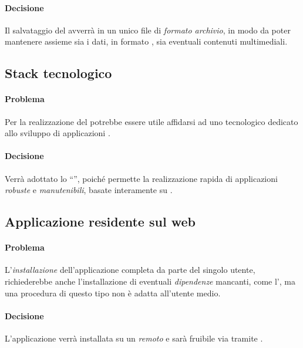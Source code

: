 \paragraph{Decisione} Il salvataggio del  avverrà in un unico file di \emph{formato archivio}, in modo da poter mantenere assieme sia i dati, in formato , sia eventuali contenuti multimediali.
\subsection{Stack tecnologico}
\paragraph{Problema} Per la realizzazione del  potrebbe essere utile affidarsi ad uno  tecnologico dedicato allo sviluppo di applicazioni .
\paragraph{Decisione} Verrà adottato lo  ``'', poiché permette la realizzazione rapida di applicazioni  \emph{robuste} e \emph{manutenibili}, basate interamente su .
\subsection{Applicazione residente sul web}
\paragraph{Problema} L’\emph{installazione} dell’applicazione completa da parte del singolo utente, richiederebbe anche l’installazione di eventuali \emph{dipendenze} mancanti, come l’, ma una procedura di questo tipo non è adatta all’utente medio.
\paragraph{Decisione} L’applicazione verrà installata su un \emph{ remoto} e sarà fruibile via  tramite .
